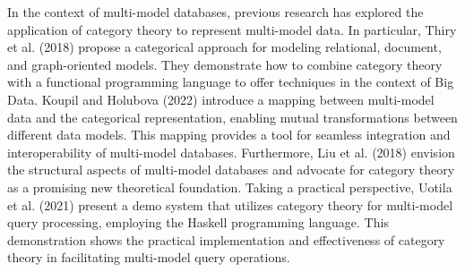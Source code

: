 In the context of multi-model databases, previous research has explored the application of category theory to  represent multi-model data. In particular, Thiry et al. (2018) \cite{thiry2018categories} propose a categorical approach for modeling relational, document, and graph-oriented models. They demonstrate how to combine category theory with a functional programming language to offer techniques in the context of Big Data. Koupil and Holubova (2022) \cite{journals/jbd/KoupilH22} introduce a mapping between multi-model data and the categorical representation, enabling mutual transformations between different data models. This mapping provides a tool for seamless integration and interoperability of multi-model databases. Furthermore, Liu et al. (2018) \cite{conf/vldb/LiuLGHPW18} envision the structural aspects of multi-model databases and advocate for category theory as a promising new theoretical foundation. Taking a practical perspective, Uotila et al. (2021) \cite{journals/pvldb/UotilaLGLDP21} present a demo system that utilizes category theory for multi-model query processing, employing the Haskell programming language. This demonstration shows the practical implementation and effectiveness of category theory in facilitating multi-model query operations.








